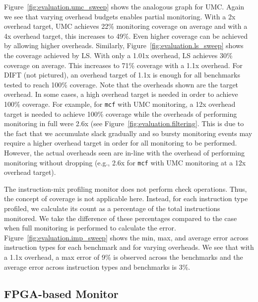 Figure~\ref{fig:evaluation.umc_sweep} shows the analogous graph for UMC. Again
we see that varying overhead budgets enables partial monitoring.
With a 2x overhead target, UMC achieves 22\% monitoring coverage on average and with a 4x overhead target, this increases to 49\%.
Even higher coverage can be achieved by allowing higher overheads.
Similarly, Figure~\ref{fig:evaluation.ls_sweep} shows the coverage achieved by LS.
With only a 1.01x overhead, LS achieves 30\% coverage on average. This increases to
71\% coverage with a 1.1x overhead. 
For DIFT (not pictured), an overhead target of 1.1x is enough for
all benchmarks tested to reach 100\% coverage.
Note that the overheads shown are the target overhead. In some cases, a high
overhead target is needed in order to achieve 100\% coverage. For example, for
{\tt mcf} with UMC monitoring, a 12x overhead target is needed to achieve 100\%
coverage while the overheads of performing monitoring in full were 2.6x (see
Figure~\ref{fig:evaluation.filtering}. This is due to the fact that we
accumulate slack gradually and so bursty monitoring events may require a higher
overhead target in order for all monitoring to be performed. However, the
actual overheads seen are in-line with the overhead of performing monitoring
without dropping (e.g., 2.6x for {\tt mcf} with UMC monitoring at a 12x
overhead target).


The instruction-mix profiling monitor does not perform check operations. Thus,
the concept of coverage is not applicable here. Instead, for each instruction
type profiled, we calculate its count as a percentage of the total instructions
monitored. We take the difference of these percentages compared to the case
when full monitoring
is performed to calculate the error. Figure~\ref{fig:evaluation.imp_sweep}
shows the min, max, and average error across
instruction types for each benchmark and for varying overheads. We see that
with a 1.1x overhead, a max error of 9\% is observed across the benchmarks and the
average error across instruction types and benchmarks is 3\%. 

\subsection{FPGA-based Monitor}
\label{sec:evaluation.fpga}

